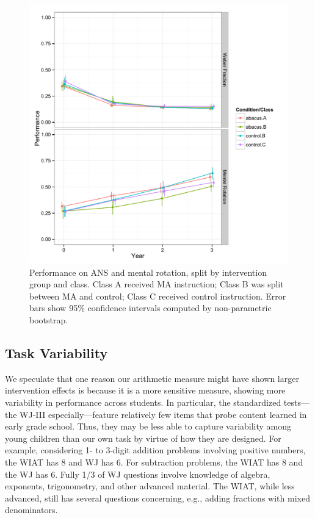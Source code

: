 \documentclass[11pt]{article}
\begin{document}
\begin{figure}[H]
\begin{center}
\includegraphics[width=5.5in]{figures/cog2_class.pdf}
\end{center}
\caption{Performance on ANS and mental rotation, split by intervention group and class. Class A received MA instruction; Class B was split between MA and control; Class C received control instruction. Error bars show 95\% confidence intervals computed by non-parametric bootstrap.}
\label{fig:cogclass2}
\end{figure}

\subsection{Task Variability}

We speculate that one reason our arithmetic measure might have shown larger intervention effects is because it is a more sensitive measure, showing more variability in performance across students. In particular, the standardized tests---the WJ-III especially---feature relatively few items that probe content learned in early grade school. Thus, they may be less able to capture variability among young children than our own task by virtue of how they are designed. For example, considering 1- to 3-digit addition problems involving positive numbers, the WIAT has 8 and WJ has 6. For subtraction problems, the WIAT has 8 and the WJ has 6. Fully 1/3 of WJ questions involve knowledge of algebra, exponents, trigonometry, and other advanced material. The WIAT, while less advanced, still has several questions concerning, e.g., adding fractions with mixed denominators. 
\end{document}
